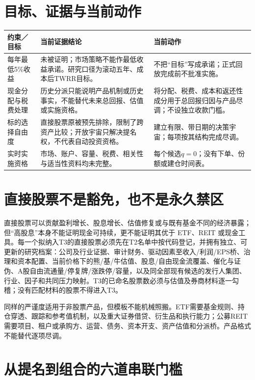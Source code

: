 \section{目标、证据与当前动作}

\begin{exhibitbox}
\small
\begin{tabularx}{\exhibitboxwidth}{L{3.0cm}P P}
\toprule
\textbf{约束／目标} & \textbf{当前证据结论} & \textbf{当前动作} \\
\midrule
每年最低5\%收益 & 未被证明；市场策略不能作最低收益承诺。研究口径为滚动五年、成本后TWRR目标。 & 不把“目标”写成承诺；正式回放完成前不批准实施。 \\
现金分配与税费处理 & 历史分派只能说明产品机制或历史事实，不能替代未来总回报、估值或实施资格。 & 将分配、税费、成本和返还性成分用于总回报归因与产品尽调；不设独立收款门槛。 \\
标的选择自由度 & 直接股票原被预先排除，限制了跨资产比较；开放宇宙只解决提名权，不代表自动投资资格。 & 建立有限、带日期的决策宇宙；每项按其结构完成尽调。 \\
实时实施资格 & 市场、账户、容量、税费、相关性与适当性资料均未完整。 & 每个候选$q=0$；没有下单、份额或建仓时间表。 \\
\bottomrule
\end{tabularx}
\end{exhibitbox}

\section{直接股票不是豁免，也不是永久禁区}

直接股票可以贡献盈利增长、股息增长、估值修复或与既有基金不同的经济暴露；但“高股息”本身不能证明现金可持续，更不能证明其优于 ETF、REIT 或现金工具。每一个拟纳入T3的直接股票必须先在T2名单中按代码登记，并拥有独立、可更新的研究档案：公司及行业证据、审计财务、驱动因素至收入/利润/EPS桥、治理和资本配置、当前价格下的熊/基/牛估值、股息/自由现金流覆盖、催化与证伪、A股自由流通量/停复牌/涨跌停/容量，以及同全部现有候选的发行人集团、行业、因子和共同压力映射。T3的已命名股票数必须与估值及券商材料逐一勾稽；没有匹配材料的股票不得进入T3。

同样的严谨度适用于非股票产品，但模板不能机械照搬。ETF需要基金规则、持仓穿透、跟踪和参考值机制，以及重大证券借贷、衍生品和执行能力；公募REIT需要项目、租户或承购方、运营、债务、资本开支、资产估值和分派桥。产品格式不能替代逐项尽调。

\section{从提名到组合的六道串联门槛}

